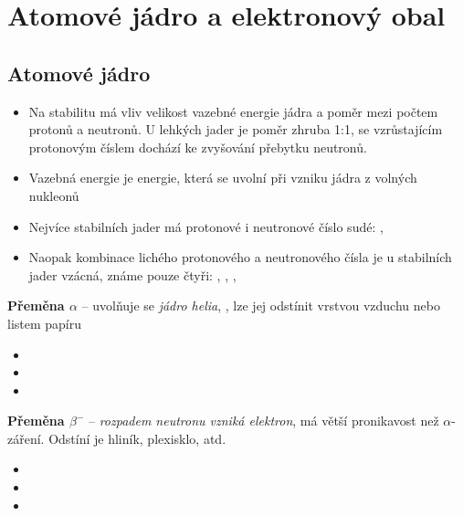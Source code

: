 \section{Atomové jádro a elektronový obal}

\subsection{Atomové jádro}

\begin{itemize}
	\item Na stabilitu má vliv velikost vazebné energie jádra a poměr mezi počtem protonů a neutronů. U lehkých jader je poměr zhruba 1:1, se vzrůstajícím protonovým číslem dochází ke zvyšování přebytku neutronů.
	\item Vazebná energie je energie, která se uvolní při vzniku jádra z volných nukleonů
	\item Nejvíce stabilních jader má protonové i neutronové číslo sudé: , 
	\item Naopak kombinace lichého protonového a neutronového čísla je u stabilních jader vzácná, známe pouze čtyři: , , , 
\end{itemize}

\textbf{Přeměna $\alpha$} -- uvolňuje se \textit{jádro helia}, , lze jej odstínit vrstvou vzduchu nebo listem papíru

\begin{itemize}
	\item {}
	\item {}
	\item {}
\end{itemize}

\textbf{Přeměna $\beta^-$} -- \textit{rozpadem neutronu vzniká elektron}, má větší pronikavost než $\alpha$-záření. Odstíní je hliník, plexisklo, atd.


\begin{itemize}
	\item {}
	\item {}
	\item {}
\end{itemize}

